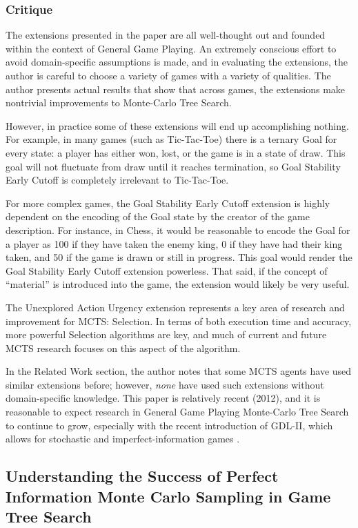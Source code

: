 \documentclass[letterpaper]{article}
\begin{document}
\subsubsection{Critique}

The extensions presented in the paper are all well-thought out and founded within the context of General Game Playing. An extremely conscious effort to avoid domain-specific assumptions is made, and in evaluating the extensions, the author is careful to choose a variety of games with a variety of qualities. The author presents actual results that show that across games, the extensions make nontrivial improvements to Monte-Carlo Tree Search.

However, in practice some of these extensions will end up accomplishing nothing. For example, in many games (such as Tic-Tac-Toe) there is a ternary Goal for every state: a player has either won, lost, or the game is in a state of draw. This goal will not fluctuate from draw until it reaches termination, so Goal Stability Early Cutoff is completely irrelevant to Tic-Tac-Toe.

For more complex games, the Goal Stability Early Cutoff extension is highly dependent on the encoding of the Goal state by the creator of the game description. For instance, in Chess, it would be reasonable to encode the Goal for a player as 100 if they have taken the enemy king, 0 if they have had their king taken, and 50 if the game is drawn or still in progress. This goal would render the Goal Stability Early Cutoff extension powerless. That said, if the concept of ``material'' is introduced into the game, the extension would likely be very useful.

The Unexplored Action Urgency extension represents a key area of research and improvement for MCTS: Selection. In terms of both execution time and accuracy, more powerful Selection algorithms are key, and much of current and future MCTS research focuses on this aspect of the algorithm.

In the Related Work section, the author notes that some MCTS agents have used similar extensions before; however, \emph{none} have used such extensions without domain-specific knowledge. This paper is relatively recent (2012), and it is reasonable to expect research in General Game Playing Monte-Carlo Tree Search to continue to grow, especially with the recent introduction of GDL-II, which allows for stochastic and imperfect-information games \cite{StanfordGGP}.

\subsection{Understanding the Success of Perfect Information Monte Carlo Sampling in Game Tree Search}
\end{document}

